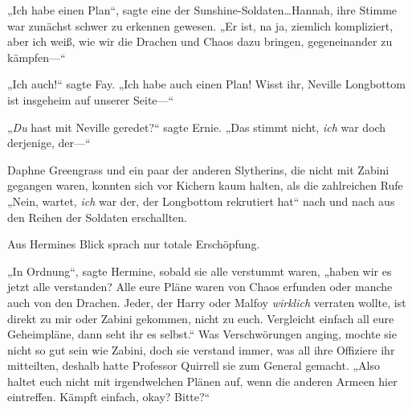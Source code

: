 „Ich habe einen Plan“, sagte eine der Sunshine-Soldaten…Hannah, ihre Stimme war zunächst schwer zu erkennen gewesen. „Er ist, na ja, ziemlich kompliziert, aber ich weiß, wie wir die Drachen und Chaos dazu bringen, gegeneinander zu kämpfen—“

„Ich auch!“ sagte Fay. „Ich habe auch einen Plan! Wisst ihr, Neville Longbottom ist insgeheim auf unserer Seite—“

„\emph{Du} hast mit Neville geredet?“ sagte Ernie. „Das stimmt nicht, \emph{ich} war doch derjenige, der—“

Daphne Greengrass und ein paar der anderen Slytherins, die nicht mit Zabini gegangen waren, konnten sich vor Kichern kaum halten, als die zahlreichen Rufe „Nein, wartet, \emph{ich} war der, der Longbottom rekrutiert hat“ nach und nach aus den Reihen der Soldaten erschallten.

Aus Hermines Blick sprach nur totale Erschöpfung.

„In Ordnung“, sagte Hermine, sobald sie alle verstummt waren, „haben wir es jetzt alle verstanden? Alle eure Pläne waren von Chaos erfunden oder manche auch von den Drachen. Jeder, der Harry oder Malfoy \emph{wirklich} verraten wollte, ist direkt zu mir oder Zabini gekommen, nicht zu euch. Vergleicht einfach all eure Geheimpläne, dann seht ihr es selbst.“ Was Verschwörungen anging, mochte sie nicht so gut sein wie Zabini, doch sie verstand immer, was all ihre Offiziere ihr mitteilten, deshalb hatte Professor Quirrell sie zum General gemacht. „Also haltet euch nicht mit irgendwelchen Plänen auf, wenn die anderen Armeen hier eintreffen. Kämpft einfach, okay? Bitte?“

